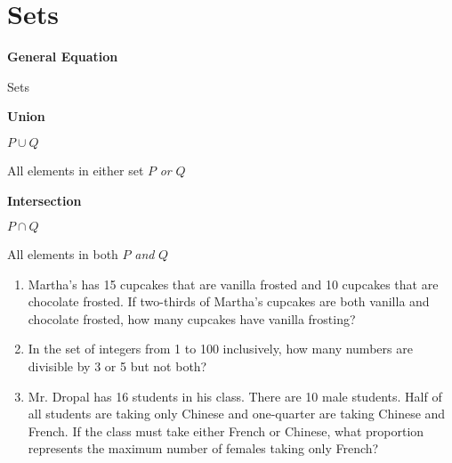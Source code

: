 \section{Sets}

\bigskip
\textbf{General Equation}

\bigskip
\begin{equationbox}{Sets}
\setlength{\columnseprule}{0pt}
\begin{center}
\begin{multicols}{2}
\textbf{\large Union}

$P\cup Q$

All elements in either set $P$ \textit{or} $Q$

\bigskip
{}


\textbf{\large Intersection}

$P\cap Q$

All elements in both $P$ \textit{and} $Q$

\bigskip
{}
\end{multicols}
\end{center}
\end{equationbox}

\bigskip
\begin{enumerate}[labelindent=*,style=multiline,leftmargin=*,label=\textbf{Example \arabic*:}]
\item Martha's has 15 cupcakes that are vanilla frosted and 10 cupcakes that are chocolate frosted. If two-thirds of Martha's cupcakes are both vanilla and chocolate frosted, how many cupcakes have vanilla frosting?
\vfill\item In the set of integers from 1 to 100 inclusively, how many numbers are divisible by 3 or 5 but not both?
\vfill\item Mr. Dropal has 16 students in his class. There are 10 male students. Half of all students are taking only Chinese and one-quarter are taking Chinese and French. If the class must take either French or Chinese, what proportion represents the maximum number of females taking only French?
\end{enumerate}

